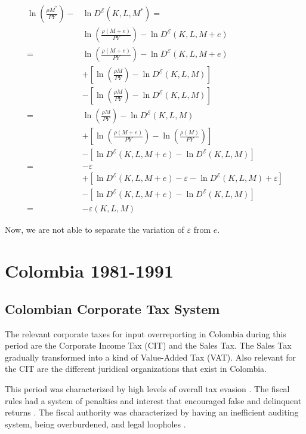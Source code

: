 \documentclass[
  12pt]{article}
\theoremstyle{definition}
\theoremstyle{remark}
\begin{document}
\[
\begin{aligned}
    \ln\left(\frac{\rho M^*}{PY}\right)-&\ln D^{\mathcal{E}}(K,L,M^*)=\\
    &\ln\left(\frac{\rho(M+e)}{PY}\right)-\ln D^{\mathcal{E}}(K,L,M+e)\\
    =&\ln\left(\frac{\rho(M+e)}{PY}\right)-\ln D^{\mathcal{E}}(K,L,M+e)\\
    &+\left[\ln\left(\frac{\rho M}{PY}\right)-\ln D^{\mathcal{E}}(K,L,M)\right]\\
    &-\left[\ln\left(\frac{\rho M}{PY}\right)-\ln D^{\mathcal{E}}(K,L,M)\right] \\
    =&\ln\left(\frac{\rho M}{PY}\right)-\ln D^{\mathcal{E}}(K,L,M) \\
    &+\left[\ln\left(\frac{\rho(M+e)}{PY}\right)-\ln\left(\frac{\rho(M)}{PY}\right)\right]\\
    &-\left[\ln D^{\mathcal{E}}(K,L,M+e)-\ln D^{\mathcal{E}}(K,L,M)\right]\\
    =& -\varepsilon \\
    &+\left[\ln D^{\mathcal{E}}(K,L,M+e)-\varepsilon-\ln D^{\mathcal{E}}(K,L,M)+\varepsilon\right]\\
    &-\left[\ln D^{\mathcal{E}}(K,L,M+e)-\ln D^{\mathcal{E}}(K,L,M)\right]\\
    =& -\varepsilon(K,L,M)
\end{aligned}
\]

Now, we are not able to separate the variation of \(\varepsilon\) from
\(e\).

\section{Colombia 1981-1991}\label{colombia-1981-1991}

\subsection{Colombian Corporate Tax
System}\label{colombian-corporate-tax-system}

The relevant corporate taxes for input overreporting in Colombia during
this period are the Corporate Income Tax (CIT) and the Sales Tax. The
Sales Tax gradually transformed into a kind of Value-Added Tax (VAT).
Also relevant for the CIT are the different juridical organizations that
exist in Colombia.

This period was characterized by high levels of overall tax evasion
\citep{Sanchez1994}. The fiscal rules had a system of penalties and
interest that encouraged false and delinquent returns
\citep{McLure1989}. The fiscal authority was characterized by having an
inefficient auditing system, being overburdened, and legal loopholes
\citep{Perry1990}.
\end{document}

